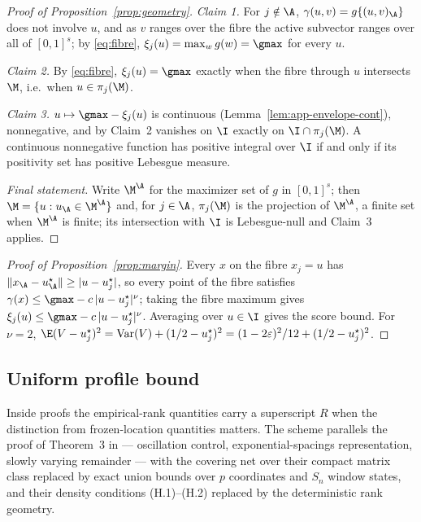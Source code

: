 \begin{proof}[Proof of Proposition~\ref{prop:geometry}]
\emph{Claim 1.}  For $j\notin\A$, $\gamma(u,v)=g\{(u,v)_{\A}\}$ does not
involve $u$, and as $v$ ranges over the fibre the active subvector ranges
over all of $[0,1]^{s}$; by \eqref{eq:fibre},
$\xi_j(u)=\max_{w}g(w)=\gmax$ for every $u$.

\emph{Claim 2.}  By \eqref{eq:fibre}, $\xi_j(u)=\gmax$ exactly when the
fibre through $u$ intersects $\M$, i.e.\ when $u\in\pi_j(\M)$.

\emph{Claim 3.}  $u\mapsto\gmax-\xi_j(u)$ is continuous
(Lemma~\ref{lem:app-envelope-cont}), nonnegative, and by Claim~2 vanishes
on $\I$ exactly on $\I\cap\pi_j(\M)$.  A continuous nonnegative function
has positive integral over $\I$ if and only if its positivity set has
positive Lebesgue measure.

\emph{Final statement.}  Write $\M^{\A}$ for the maximizer set of $g$ in
$[0,1]^{s}$; then $\M=\{u:u_{\A}\in\M^{\A}\}$ and, for $j\in\A$,
$\pi_j(\M)$ is the projection of $\M^{\A}$, a finite set when $\M^{\A}$ is
finite; its intersection with $\I$ is Lebesgue-null and Claim~3 applies.
\end{proof}

\begin{proof}[Proof of Proposition~\ref{prop:margin}]
Every $x$ on the fibre $x_j=u$ has
$\|x_{\A}-u^\star_{\A}\|\ge|u-u^\star_j|$, so every point of the fibre
satisfies
$\gamma(x)\le\gmax-c\,|u-u^\star_j|^\nu$; taking the fibre maximum gives
$\xi_j(u)\le\gmax-c\,|u-u^\star_j|^\nu$.  Averaging
over $u\in\I$ gives the score bound.  For $\nu=2$,
$\E(V-u_j^\star)^2=\mathrm{Var}(V)+(1/2-u_j^\star)^2
=(1-2\varepsilon)^2/12+(1/2-u_j^\star)^2$.
\end{proof}

\subsection{Uniform profile bound}\label{app:rank}

Inside proofs the empirical-rank quantities carry a superscript $R$ when
the distinction from frozen-location quantities matters.  The scheme
parallels the proof of Theorem~3 in \citet{gardesPodgorny2025} ---
oscillation control, exponential-spacings representation, slowly varying
remainder --- with the covering net over their compact matrix class
replaced by exact union bounds over $p$ coordinates and $S_n$ window
states, and their density conditions (H.1)--(H.2) replaced by the
deterministic rank geometry.

